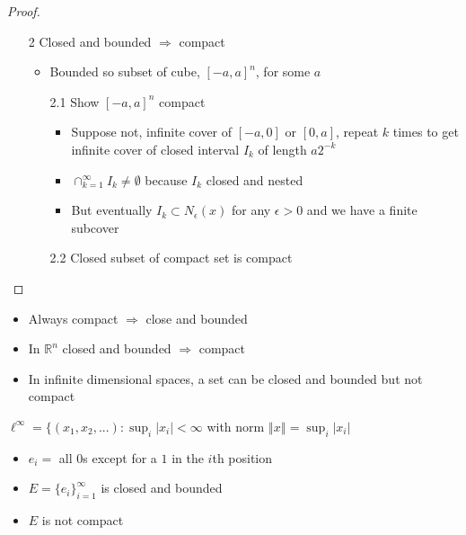 \documentclass[compress]{beamer}
\def\R{\mathbb{R}}
\newcommand{\norm}[1]{\left\Vert {#1} \right\Vert}
\begin{document}
\begin{frame}
  \begin{proof}
    \begin{itemize}
    \item[2] Closed and bounded $\Rightarrow$ compact
      \begin{itemize}
      \item Bounded so subset of cube, $[-a,a]^n$, for some $a$
      \item[2.1] Show $[-a,a]^n$ compact
        \begin{itemize}
        \item Suppose not, infinite cover of $[-a,0]$ or $[0,a]$,
          repeat $k$ times to get infinite cover of closed interval
          $I_k$ of length $a 2^{-k}$
        \item $\cap_{k=1}^\infty I_k \neq \emptyset$ because $I_k$
          closed and nested
        \item But eventually $I_k \subset N_\epsilon(x)$ for any
          $\epsilon>0$ and we have a finite subcover
        \end{itemize}
      \item[2.2] Closed subset of compact set is compact
      \end{itemize}
    \end{itemize}
  \end{proof}
\end{frame}

\begin{frame}
  \begin{itemize}
  \item Always compact $\Rightarrow$ close and bounded
  \item In $\R^n$ closed and bounded $\Rightarrow$ compact
  \item In infinite dimensional spaces, a set can be closed and
    bounded but not compact
  \end{itemize}
  \begin{example}
    $\ell^\infty = \{ (x_1, x_2, ...) : \sup_{i} |x_i| < \infty$ with
    norm $\norm{x} = \sup_{i} |x_i|$ 
    \begin{itemize}
    \item $e_i = $ all $0$s except for a $1$ in the  $i$th position
    \item $E = \{e_i\}_{i=1}^\infty$ is closed and bounded
    \item $E$ is not compact 
    \end{itemize}
  \end{example}
\end{frame}
\end{document}
